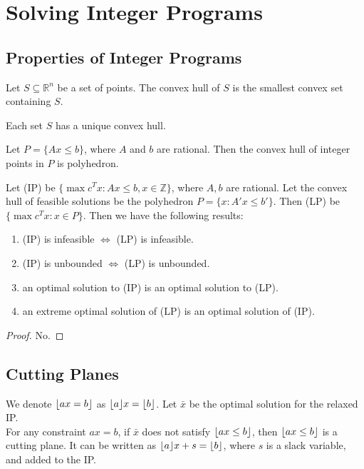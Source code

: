 \documentclass[a4paper]{report}
\DeclarePairedDelimiter\floor{\lfloor}{\rfloor}
\begin{document}
\newpage

\section{Solving Integer Programs}
\subsection{Properties of Integer Programs}
\begin{definition}
  Let $S \subseteq \mathbb R^n$ be a set of points. The convex hull of $S$ is the smallest convex set containing $S$.
  \begin{corollary}
    Each set $S$ has a unique convex hull.
  \end{corollary}
\end{definition}

\begin{theorem}
  Let $P = \{Ax \leq b\}$, where $A$ and $b$ are rational. Then the convex hull of integer points in $P$ is polyhedron.
\end{theorem}

\begin{theorem}
  Let (IP) be $\{\max c^Tx : Ax \leq b, x \in \mathbb Z\}$, where $A, b$ are rational. Let the convex hull of feasible solutions be the polyhedron $P =\{x : A' x \leq b'\}$. Then (LP) be $\{\max c^T x : x \in P\}$. Then we have the following results:
  \begin{enumerate}
    \item (IP) is infeasible $\iff$ (LP) is infeasible.
    \item (IP) is unbounded $\iff$ (LP) is unbounded.
    \item an optimal solution to (IP) is an optimal solution to (LP).
    \item an extreme optimal solution of (LP) is an optimal solution of (IP).
  \end{enumerate}
  \begin{proof}
    No.
  \end{proof}
\end{theorem}

\subsection{Cutting Planes}

\begin{definition}
  We denote $\floor{ax = b}$ as $\floor{a}x = \floor{b}$. Let $\bar x$ be the optimal solution for the relaxed IP. \\
  For any constraint $ax = b$, if $\bar x$ does not satisfy $\floor{ax \leq b}$, then $\floor{ax \leq b}$ is a cutting plane. It can be written as $\floor{a}x + s = \floor{b}$, where $s$ is a slack variable, and added to the IP.
\end{definition}
\end{document}
